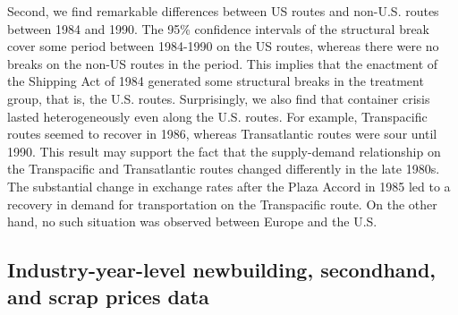 \documentclass[11pt]{article}
\begin{document}
Second, we find remarkable differences between US routes and non-U.S. routes between 1984 and 1990. The 95\% confidence intervals of the structural break cover some period between 1984-1990 on the US routes, whereas there were no breaks on the non-US routes in the period. This implies that the enactment of the Shipping Act of 1984 generated some structural breaks in the treatment group, that is, the U.S. routes. Surprisingly, we also find that container crisis lasted heterogeneously even along the U.S. routes. For example, Transpacific routes seemed to recover in 1986, whereas Transatlantic routes were sour until 1990. This result may support the fact that the supply-demand relationship on the Transpacific and Transatlantic routes changed differently in the late 1980s. The substantial change in exchange rates after the Plaza Accord in 1985 led to a recovery in demand for transportation on the Transpacific route. On the other hand, no such situation was observed between Europe and the U.S.





\subsection{Industry-year-level newbuilding, secondhand, and scrap prices data}
\end{document}
